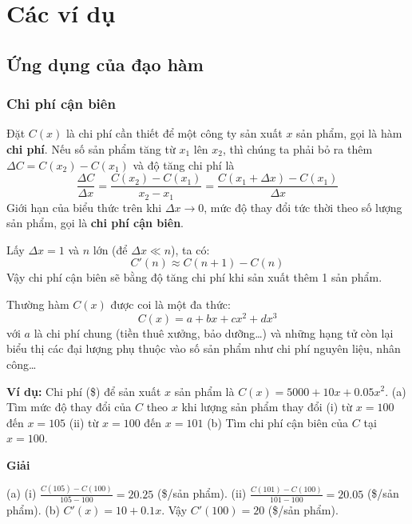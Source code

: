 \documentclass[13pt]{article}
\begin{document}
\section{Các ví dụ}
\subsection{Ứng dụng của đạo hàm}
\subsubsection{Chi phí cận biên}
\par Đặt $C(x)$ là chi phí cần thiết để một công ty sản xuất $x$ sản phẩm, gọi là hàm \textbf{chi phí}. Nếu số sản phẩm tăng từ $x_1$ lên $x_2$, thì chúng ta phải bỏ ra thêm $\Delta C=C(x_2)-C(x_1)$ và độ tăng chi phí là $$\frac{\Delta C}{\Delta x}=\frac{C(x_2)-C(x_1)}{x_2-x_1}=\frac{C(x_1+\Delta x)-C(x_1)}{\Delta x}$$Giới hạn của biểu thức trên khi $\Delta x\to0$, mức độ thay đổi tức thời theo số lượng sản phẩm, gọi là \textbf{chi phí cận biên}.
\par Lấy $\Delta x=1$ và $n$ lớn (để $\Delta x\ll n$), ta có: $$C'(n)\approx C(n+1)-C(n)$$Vậy chi phí cận biên sẽ bằng độ tăng chi phí khi sản xuất thêm 1 sản phẩm.
\par Thường hàm $C(x)$ được coi là một đa thức: $$C(x)=a+bx+cx^2+dx^3$$ với $a$ là chi phí chung (tiền thuê xưởng, bảo dưỡng\dots) và những hạng tử còn lại biểu thị các đại lượng phụ thuộc vào số sản phẩm như chi phí nguyên liệu, nhân công\dots\newline
\par\textbf{Ví dụ:} Chi phí (\$) để sản xuất $x$ sản phẩm là $C(x)=5000+10x+0.05x^2$.\newline
\hspace*{1cm}(a) Tìm mức độ thay đổi của $C$ theo $x$ khi lượng sản phẩm thay đổi\newline
\hspace*{2cm}(i) từ $x=100$ đến $x=105$\newline
\hspace*{2cm}(ii) từ $x=100$ đến $x=101$\newline
\hspace*{1cm}(b) Tìm chi phí cận biên của $C$ tại $x=100$.\newline
\centerline{\textbf{Giải}}\newline
(a) (i) $\frac{C(105)-C(100)}{105-100}=20.25$ (\$/sản phẩm).\newline
\hspace*{0.5cm}(ii) $\frac{C(101)-C(100)}{101-100}=20.05$ (\$/sản phẩm).\newline
(b) $C'(x)=10+0.1x$. Vậy $C'(100)=20$ (\$/sản phẩm).
\end{document}
